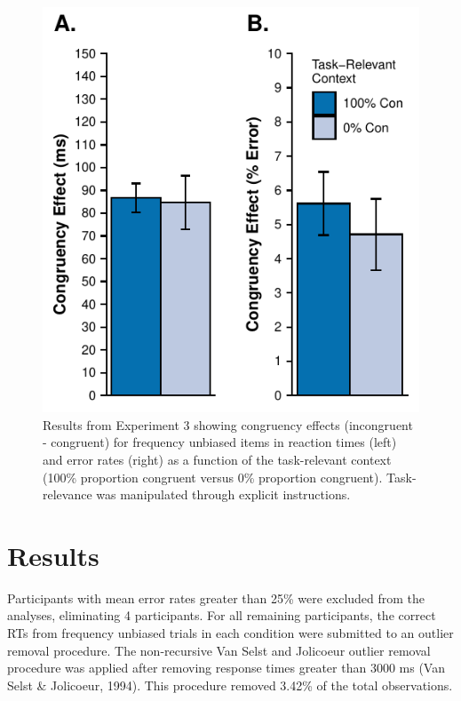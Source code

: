 \documentclass[english,,man,floatsintext]{apa6}
\begin{document}
\begin{figure}
\centering
\includegraphics{manuscript_pretty_files/figure-latex/figure4-1.pdf}
\caption{\label{fig:figure4}Results from Experiment 3 showing congruency effects (incongruent - congruent) for frequency unbiased items in reaction times (left) and error rates (right) as a function of the task-relevant context (100\% proportion congruent versus 0\% proportion congruent). Task-relevance was manipulated through explicit instructions.}
\end{figure}



\hypertarget{results-2}{%
\section{Results}\label{results-2}}

Participants with mean error rates greater than 25\% were excluded from the analyses, eliminating 4 participants. For all remaining participants, the correct RTs from frequency unbiased trials in each condition were submitted to an outlier removal procedure. The non-recursive Van Selst and Jolicoeur outlier removal procedure was applied after removing response times greater than 3000 ms (Van Selst \& Jolicoeur, 1994). This procedure removed 3.42\% of the total observations.
\end{document}
